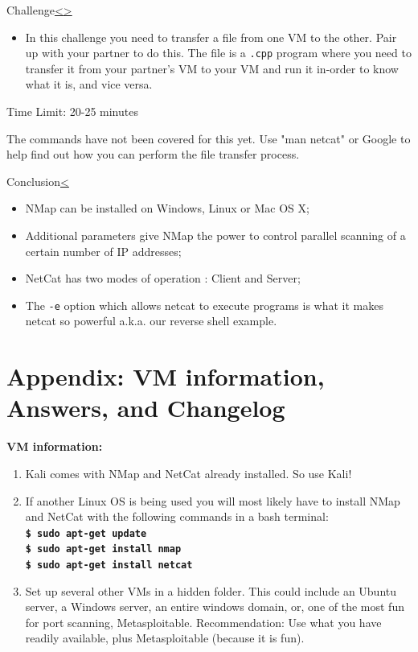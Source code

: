 \documentclass[12pt]{article}
\newcommand{\code}[1]{\texttt{\bfseries#1}}
\newenvironment{instructionblock}{\Large\bgroup}{\egroup}
\begin{document}
\pagebreak
\begin{slide}{Challenge}{\hyperref[slide 25]{\textless}\hyperref[slide 27]{\textgreater}}
   \begin{instructionblock}
      \begin{itemize}
         \item In this challenge you need to transfer a file from one VM to the other. Pair up with your partner to do this. The file is a \texttt{.cpp} program where you need to transfer it from your partner's VM to your VM and run it in-order to know what it is, and vice versa.
      \end{itemize}
   \end{instructionblock}
    Time Limit: 20-25 minutes
\end{slide}
The commands have not been covered for this yet. Use "man netcat" or Google to help find out how you can perform the file transfer process.

\pagebreak
\begin{slide}{Conclusion}{\hyperref[slide 26]{\textless}}
\begin{instructionblock}
\begin{itemize}
\item  NMap can be installed on Windows, Linux or Mac OS X;
\item Additional parameters give  NMap the power to control parallel scanning of a certain number of IP addresses;
\item NetCat has two modes of operation : Client and Server;
\item The \texttt{-e} option which allows netcat to execute programs is what it makes netcat so powerful a.k.a. our reverse shell example.
\end{itemize}
\end{instructionblock}
\end{slide}
\vfill

\pagebreak
\section{Appendix: VM information, Answers, and Changelog}

\textbf{VM information:}
   
\begin{enumerate}
   \item Kali comes with  NMap and NetCat already installed. So use Kali!
   \item If another Linux OS is being used you will most likely have to install  NMap and NetCat with the following commands in a bash terminal:\\
      \code{\$ sudo apt-get update\\
      \$ sudo apt-get install nmap \\
      \$ sudo apt-get install netcat}
    \item Set up several other VMs in a hidden folder. This could include an Ubuntu server, a Windows server, an entire windows domain, or, one of the most fun for port scanning, Metasploitable. Recommendation: Use what you have readily available, plus Metasploitable (because it is fun).
\end{enumerate}
\end{document}
